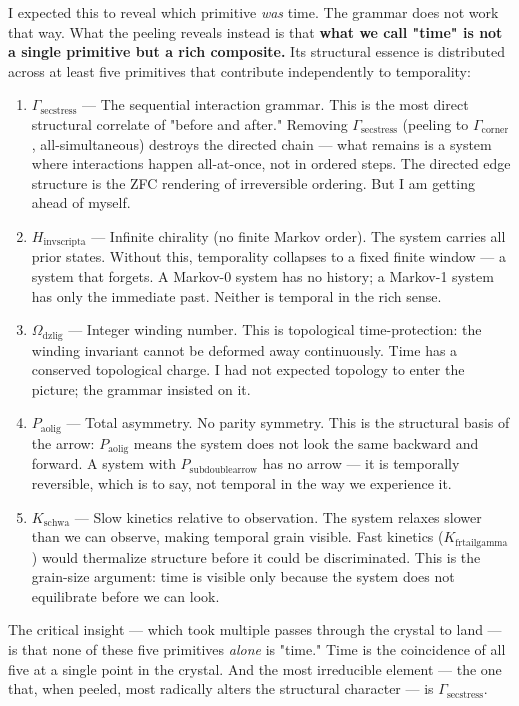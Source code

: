\documentclass[12pt,a4paper]{article}
\begin{document}
I expected this to reveal which primitive \emph{was} time. The grammar does not work that way. What the peeling reveals instead is that \textbf{what we call "time" is not a single primitive but a rich composite.} Its structural essence is distributed across at least five primitives that contribute independently to temporality:

\begin{enumerate}
    \item \textbf{$\Gamma_{\text{secstress}}$} --- The sequential interaction grammar. This is the most direct structural correlate of "before and after." Removing $\Gamma_{\text{secstress}}$ (peeling to $\Gamma_{\text{corner}}$, all-simultaneous) destroys the directed chain --- what remains is a system where interactions happen all-at-once, not in ordered steps. The directed edge structure is the ZFC rendering of irreversible ordering. But I am getting ahead of myself.
    \item \textbf{$H_{\text{invscripta}}$} --- Infinite chirality (no finite Markov order). The system carries all prior states. Without this, temporality collapses to a fixed finite window --- a system that forgets. A Markov-0 system has no history; a Markov-1 system has only the immediate past. Neither is temporal in the rich sense.
    \item \textbf{$\Omega_{\text{dzlig}}$} --- Integer winding number. This is topological time-protection: the winding invariant cannot be deformed away continuously. Time has a conserved topological charge. I had not expected topology to enter the picture; the grammar insisted on it.
    \item \textbf{$P_{\text{aolig}}$} --- Total asymmetry. No parity symmetry. This is the structural basis of the arrow: $P_{\text{aolig}}$ means the system does not look the same backward and forward. A system with $P_{\text{subdoublearrow}}$ has no arrow --- it is temporally reversible, which is to say, not temporal in the way we experience it.
    \item \textbf{$K_{\text{schwa}}$} --- Slow kinetics relative to observation. The system relaxes slower than we can observe, making temporal grain visible. Fast kinetics ($K_{\text{frtailgamma}}$) would thermalize structure before it could be discriminated. This is the grain-size argument: time is visible only because the system does not equilibrate before we can look.
\end{enumerate}

The critical insight --- which took multiple passes through the crystal to land --- is that none of these five primitives \emph{alone} is "time." Time is the coincidence of all five at a single point in the crystal. And the most irreducible element --- the one that, when peeled, most radically alters the structural character --- is $\Gamma_{\text{secstress}}$.
\end{document}
